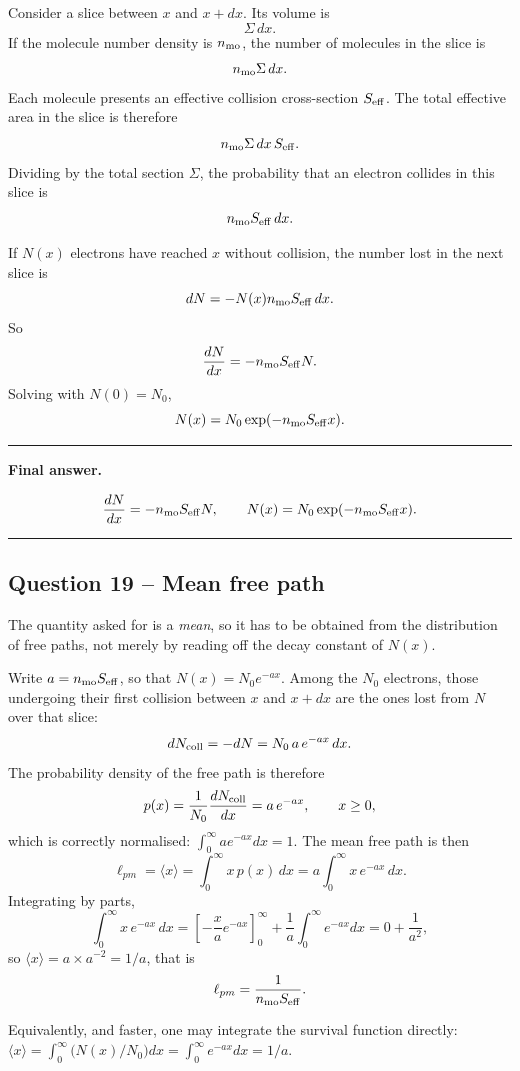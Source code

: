 \documentclass[11pt,a4paper]{article}
\newenvironment{finalanswer}{%
  \begin{center}\begin{minipage}{0.94\linewidth}\hrule\vspace{0.45em}\textbf{Final answer. }%
}{%
  \vspace{0.45em}\hrule\end{minipage}\end{center}%
}
\begin{document}
Consider a slice between $x$ and $x+dx$. Its volume is
\[
 \Sigma\,dx.
\]
If the molecule number density is $n_{\rm mo}$, the number of molecules in the slice is
\[
 n_{\rm mo}\Sigma\,dx.
\]
Each molecule presents an effective collision cross-section $S_{\rm eff}$. The total effective area in the slice is therefore
\[
 n_{\rm mo}\Sigma\,dx\,S_{\rm eff}.
\]
Dividing by the total section $\Sigma$, the probability that an electron collides in this slice is
\[
 n_{\rm mo}S_{\rm eff}\,dx.
\]

If $N(x)$ electrons have reached $x$ without collision, the number lost in the next slice is
\[
 dN=-N(x)n_{\rm mo}S_{\rm eff}\,dx.
\]
So
\[
 \frac{dN}{dx}=-n_{\rm mo}S_{\rm eff}N.
\]
Solving with $N(0)=N_0$,
\[
 N(x)=N_0\exp(-n_{\rm mo}S_{\rm eff}x).
\]

\begin{finalanswer}
\[
\frac{dN}{dx}=-n_{\rm mo}S_{\rm eff}N,
\qquad
N(x)=N_0\exp(-n_{\rm mo}S_{\rm eff}x).
\]
\end{finalanswer}

\subsection*{Question 19 -- Mean free path}

The quantity asked for is a \emph{mean}, so it has to be obtained from the
distribution of free paths, not merely by reading off the decay constant of
$N(x)$.

Write $a=n_{\rm mo}S_{\rm eff}$, so that $N(x)=N_0e^{-ax}$. Among the $N_0$
electrons, those undergoing their first collision between $x$ and $x+dx$ are the
ones lost from $N$ over that slice:
\[
 dN_{\rm coll}=-dN=N_0\,a\,e^{-ax}\,dx.
\]
The probability density of the free path is therefore
\[
 p(x)=\frac{1}{N_0}\frac{dN_{\rm coll}}{dx}=a\,e^{-ax},
 \qquad x\geq0,
\]
which is correctly normalised: $\int_0^{\infty}a e^{-ax}dx=1$. The mean free path
is then
\[
 \ell_{pm}=\langle x\rangle=\int_0^{\infty}x\,p(x)\,dx
 =a\int_0^{\infty}x\,e^{-ax}\,dx.
\]
Integrating by parts,
\[
 \int_0^{\infty}x\,e^{-ax}\,dx
 =\left[-\frac{x}{a}e^{-ax}\right]_0^{\infty}
 +\frac{1}{a}\int_0^{\infty}e^{-ax}dx
 =0+\frac{1}{a^2},
\]
so $\langle x\rangle=a\times a^{-2}=1/a$, that is
\[
 \ell_{pm}=\frac{1}{n_{\rm mo}S_{\rm eff}}.
\]

Equivalently, and faster, one may integrate the survival function directly:
$\langle x\rangle=\int_0^{\infty}\bigl(N(x)/N_0\bigr)dx=\int_0^{\infty}e^{-ax}dx=1/a$.
\end{document}
